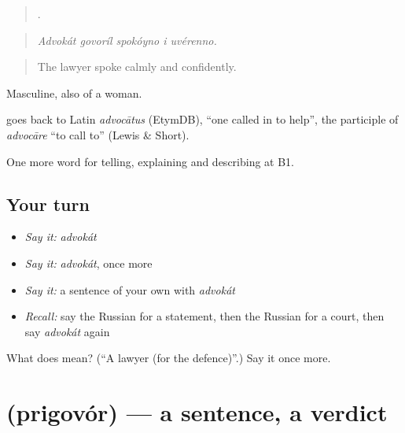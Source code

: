 \begin{quote}
    .
\end{quote}

\begin{quote}
\emph{Advokát govoríl spokóyno i uvérenno.}
\end{quote}

\begin{quote}
The lawyer spoke calmly and confidently.
\end{quote}

Masculine, also of a woman.

\begin{cousinweb}
\emph{} goes back to Latin \emph{advocātus} (EtymDB), \textquotedblleft{}one called in to help\textquotedblright{}, the participle of \emph{advocāre} \textquotedblleft{}to call to\textquotedblright{} (Lewis \& Short).
\end{cousinweb}

\begin{grammarlens}[title={What you've built}]
One more word for telling, explaining and describing at B1.
\end{grammarlens}

\subsection*{Your turn}
\begin{itemize}
\raggedright
  \item \emph{Say it:} \emph{advokát}
  \item \emph{Say it:} \emph{advokát}, once more
  \item \emph{Say it:} a sentence of your own with \emph{advokát}
  \item \emph{Recall:} say the Russian for a statement, then the Russian for a court, then say \emph{advokát} again
\end{itemize}

\begin{tcolorbox}[breakable,colback=teal!4,colframe=teal!35!black,title={Before you move on}]
What does  mean? (\textquotedblleft{}A lawyer (for the defence)\textquotedblright{}.) Say it once more.
\end{tcolorbox}
\section[\texorpdfstring{\ru{приговор} (prigovór)}{приговор (prigovór)}]{ (prigovór) — a sentence, a verdict}


